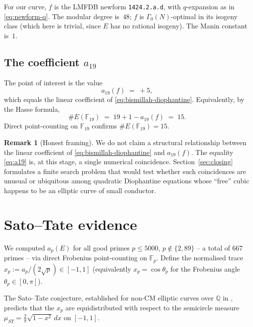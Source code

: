 \documentclass[11pt,a4paper]{article}
\theoremstyle{plain}
\theoremstyle{definition}
\newtheorem{remark}[theorem]{Remark}
\newcommand{\Q}{\mathbb{Q}}
\newcommand{\F}{\mathbb{F}}
\begin{document}
For our curve, $f$ is the LMFDB newform \texttt{1424.2.a.d}, with
$q$-expansion as in \eqref{eq:newform-q}. The modular degree is~$48$;
$f$ is $\Gamma_0(N)$-optimal in its isogeny class (which here is
trivial, since $E$ has no rational isogeny). The Manin constant
is~$1$.

\subsection{The coefficient $a_{19}$}

The point of interest is the value
\begin{equation}\label{eq:a19}
  a_{19}(f) \;=\; +5,
\end{equation}
which equals the linear coefficient of \eqref{eq:bismillah-diophantine}.
Equivalently, by the Hasse formula,
\begin{equation*}
  \#E(\F_{19}) \;=\; 19 + 1 - a_{19}(f) \;=\; 15.
\end{equation*}
Direct point-counting on $\F_{19}$ confirms $\#E(\F_{19}) = 15$.

\begin{remark}[Honest framing]
We do not claim a structural relationship between the linear
coefficient of \eqref{eq:bismillah-diophantine} and $a_{19}(f)$. The
equality \eqref{eq:a19} is, at this stage, a single numerical
coincidence. Section~\ref{sec:closing} formulates a finite search
problem that would test whether such coincidences are unusual or
ubiquitous among quadratic Diophantine equations whose ``free''
cubic happens to be an elliptic curve of small conductor.
\end{remark}

\section{Sato--Tate evidence}
\label{sec:satotate}

We computed $a_p(E)$ for all good primes $p \le 5000$,
$p \notin \{2, 89\}$ -- a total of $667$ primes -- via direct
Frobenius point-counting on $\F_p$. Define the normalised trace
$x_p := a_p / (2 \sqrt p) \in [-1, 1]$
(equivalently $x_p = \cos \theta_p$ for the Frobenius angle
$\theta_p \in [0, \pi]$).

The Sato--Tate conjecture, established for non-CM elliptic curves
over $\Q$ in \cite{HSBT2010, BLGHT2011, ClozelHarrisTaylor2008},
predicts that the $x_p$ are equidistributed with respect to the
semicircle measure
$\mu_{ST} = \frac{2}{\pi}\sqrt{1 - x^2}\, dx$
on $[-1, 1]$.
\end{document}
